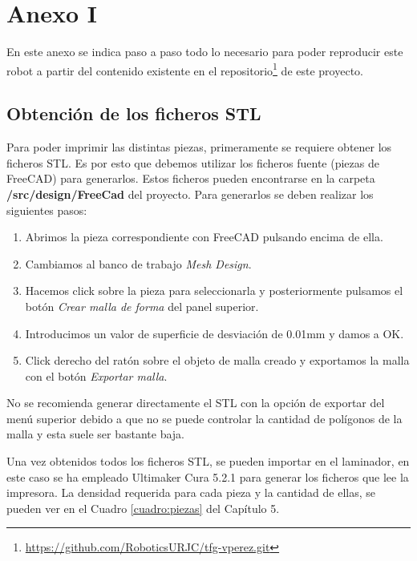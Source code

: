 \chapter*{Anexo I}
\label{cap:anexoi}

\noindent En este anexo se indica paso a paso todo lo necesario para poder reproducir este robot a partir del contenido 
existente en el repositorio\footnote{\url{https://github.com/RoboticsURJC/tfg-vperez.git}} de este proyecto.

\section*{Obtención de los ficheros STL}
\noindent Para poder imprimir las distintas piezas, primeramente se requiere obtener los ficheros STL. Es por esto que  
debemos utilizar los ficheros fuente (piezas de FreeCAD) para generarlos. Estos ficheros pueden 
encontrarse en la carpeta \textbf{/src/design/FreeCad} del proyecto. Para generarlos se deben realizar los siguientes pasos:
\begin{enumerate}
\item Abrimos la pieza correspondiente con FreeCAD pulsando encima de ella.
\item Cambiamos al banco de trabajo \textit{Mesh Design}.
\item Hacemos click sobre la pieza para seleccionarla y posteriormente pulsamos el botón \textit{Crear malla de forma} del panel superior.
\item Introducimos un valor de superficie de desviación de 0.01mm y damos a OK.
\item Click derecho del ratón sobre el objeto de malla creado y exportamos la malla con el botón \textit{Exportar malla}. 
\end{enumerate}

\begin{tcolorbox}[colback=blue!5!white,colframe=blue!75!black,title=Nota]
    No se recomienda generar directamente el STL con la opción de exportar del menú superior debido a que no se puede controlar la cantidad de polígonos 
    de la malla y esta suele ser bastante baja.
\end{tcolorbox}

Una vez obtenidos todos los ficheros STL, se pueden importar en el laminador, en este caso se ha empleado 
Ultimaker Cura 5.2.1 para generar los ficheros que lee la impresora. La densidad requerida para cada pieza 
y la cantidad de ellas, se pueden ver en el Cuadro \ref{cuadro:piezas} del Capítulo 5.


